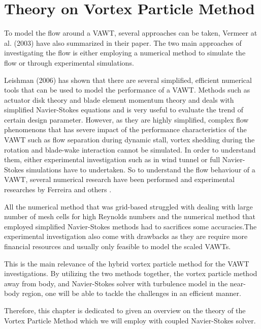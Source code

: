 \chapter{Theory on Vortex Particle Method}
\label{ch:theory}

To model the flow around a VAWT, several approaches can be taken, Vermeer at al. (2003) \cite{Vermeer2003} have also summarized in their paper. The two main approaches of investigating the flow is either employing a numerical method to simulate the flow or through experimental simulations.

Leishman (2006) \cite{leishman2006principles} has shown that there are several simplified, efficient numerical tools that can be used to model the performance of a VAWT. Methods such as actuator disk theory and blade element momentum theory and deals with simplified Navier-Stokes equations and is very useful to evaluate the trend of certain design parameter. However, as they are highly simplified, complex flow phenomenons that has severe impact of the performance characteristics of the VAWT such as flow separation during dynamic stall, vortex shedding during the rotation and blade-wake interaction cannot be simulated. In order to understand them, either experimental investigation such as in wind tunnel or full Navier-Stokes simulations have to undertaken. So to understand the flow behaviour of a VAWT, several numerical research have been performed \cite{Almohammadi2013} \cite{Ferreira2007} \cite{Islam2008} \cite{Merz2012} and experimental researches by Ferreira \cite{SimaoFerreira2008} \cite{Ferreira} and others \cite{Howell2010} \cite{Mertens2003}.

All the numerical method that was grid-based struggled with dealing with large number of mesh cells for high Reynolds numbers and the numerical method that employed simplified Navier-Stokes methods had to sacrifices some accuracies.The experimental investigation also come with drawbacks as they are require more financial resources and usually only feasible to model the scaled VAWTs.

This is the main relevance of the hybrid vortex particle method for the VAWT investigations. By utilizing the two methods together, the vortex particle method away from body, and Navier-Stokes solver with turbulence model in the near-body region, one will be able to tackle the challenges in an efficient manner.

Therefore, this chapter is dedicated to given an overview on the theory of the Vortex Particle Method which we will employ with coupled Navier-Stokes solver. 

